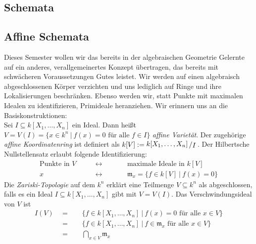 \documentclass[11pt]{book}
\theoremstyle{nonumberbreak}
\newcommand{\slant}[2]{{\raisebox{.1em}{$#1$}\left/\raisebox{-.1em}{$#2$}\right.}}
\begin{document}
\begin{spacing}{1.4}
\thispagestyle{empty}


\chapter{Schemata} %
\setlength\abovedisplayshortskip{0pt}
\setlength\belowdisplayshortskip{10pt}
\setlength\abovedisplayskip{10pt}
\setlength\belowdisplayskip{10pt}


\renewcommand*\thesection{§ \arabic{section}\quad}
\section{Affine Schemata} %
\renewcommand*\thesection{\arabic{section}}
\thispagestyle{empty}

Dieses Semester wollen wir das bereits in der algebraischen Geometrie Gelernte auf ein anderes, verallgemeinertes Konzept übertragen, das bereits mit schwächeren Voraussetzungen Gutes leistet.
Wir werden auf einen algebraisch abgeschlossenen Körper verzichten und uns lediglich auf Ringe und ihre Lokalisierungen beschränken. Ebenso werden wir, statt Punkte mit maximalen Idealen zu identifizieren, Primideale heranziehen. Wir erinnern uns an die Basiskonstruktionen:\\
Sei $I \subseteq k[X_1, \ldots, X_n]$ ein Ideal. Dann heißt $V=V(I)= \{x \in k^n \ \vert \ f(x)=0 \textrm{ für alle } f \in I\}$ \textit{affine Varietät}. Der zugehörige \textit{affine Koordinatenring} ist definiert als $k[V]:= \slant{k[X_1, \ldots, X_n]}{I}$.	Der Hilbertsche Nullstellensatz erlaubt folgende Identifizierung:
\setlength{\abovedisplayskip}{5.5pt}
\setlength{\belowdisplayskip}{5.5pt}
\begin{alignat*}{5}
\textrm{Punkte in }V \qquad &\longleftrightarrow && \qquad \textrm{maximale Ideale in } k[V] \\
x \qquad &\longleftrightarrow && \qquad \mathfrak{m}_x = \{f \in k[V] \ \vert \ f(x)=0 \}
\end{alignat*}
Die \textit{Zariski-Topologie} auf dem $k^n$ erklärt eine Teilmenge $V\subseteq k^n$ als abgeschlossen, falls es ein Ideal $I \subseteq k[X_1, \ldots, X_n]$ gibt mit $V=V(I)$. Das Verschwindungsideal von $V$ ist
\setlength{\abovedisplayskip}{5.5pt}
\setlength{\belowdisplayskip}{5.5pt}
\begin{alignat*}{5}
I(V)\ \ &=&& \ \ \{ f \in k[X_1, \ldots, X_n] \ \vert \ f(x)=0 \textrm{ für alle } x \in V \} \\
&=&& \ \ \{f \in k[X_1, \ldots, X_n] \ \vert \ f \in \mathfrak{m}_x \textrm{ für alle } x \in V \} \\
&=&& \ \ \bigcap_{x \in V} \mathfrak{m}_x 
\end{alignat*}


\end{spacing}
\end{document}
